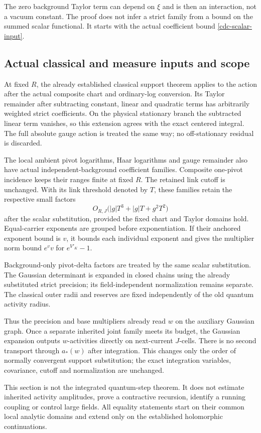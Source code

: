 The zero background Taylor term can depend on $\xi$ and is then
an interaction, not a vacuum constant. The proof does not infer
a strict family from a bound on the summed scalar functional.
It starts with the actual coefficient bound
\eqref{cdc-scalar-input}.

\subsection{Actual classical and measure inputs and scope}
\label{cdc-matching-section}

At fixed $R$, the already established classical support theorem
applies to the action after the actual composite chart and
ordinary-log conversion. Its Taylor remainder after subtracting
constant, linear and quadratic terms has arbitrarily weighted
strict coefficients. On the physical stationary branch the
subtracted linear term vanishes, so this extension agrees with
the exact centered integral. The full absolute gauge action is
treated the same way; no off-stationary residual is discarded.

The local ambient pivot logarithms, Haar logarithms and gauge
remainder also have actual independent-background coefficient
families. Composite one-pivot incidence keeps their ranges
finite at fixed $R$. The retained link cutoff is unchanged.
With its link threshold denoted by $T$, these families retain
the respective small factors
\begin{equation}
 O_{R,J}\bigl(|g|T^3+|g|T+g^2T^2\bigr)
 \label{cdc-base-smallness}
\end{equation}
after the scalar substitution, provided the fixed chart and
Taylor domains hold. Equal-carrier exponents are grouped before
exponentiation. If their anchored exponent bound is $v$, it
bounds each individual exponent and gives the multiplier norm
bound $e^v v$ for $e^{V'_K}-1$.

Background-only pivot-delta factors are treated by the same
scalar substitution. The Gaussian determinant is expanded in
closed chains using the already substituted strict precision;
its field-independent normalization remains separate. The
classical outer radii and reserves are fixed independently of
the old quantum activity radius.

Thus the precision and base multipliers already read $w$ on
the auxiliary Gaussian graph. Once a separate inherited joint
family meets its budget, the Gaussian expansion outputs
$w$-activities directly on next-current $J$-cells. There is no
second transport through $a_*(w)$ after integration. This changes
only the order of normally convergent support substitution;
the exact integration variables, covariance, cutoff and
normalization are unchanged.

This section is not the integrated quantum-step theorem. It
does not estimate inherited activity amplitudes, prove a
contractive recursion, identify a running coupling or control
large fields. All equality statements start on their common
local analytic domains and extend only on the established
holomorphic continuations.
